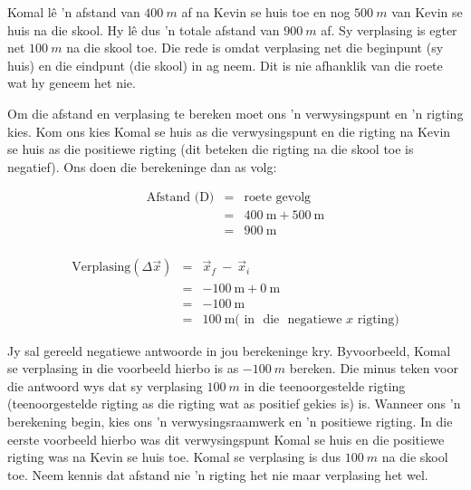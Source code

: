 Komal l\^e 'n afstand van $400~m$ af na Kevin se huis toe en nog $500~m$ van Kevin se huis na die skool. Hy l\^e dus 'n totale afstand van $900~m$ af. Sy verplasing is egter net $100~m$ na die skool toe. Die rede is omdat verplasing net die beginpunt (sy huis) en die eindpunt (die skool) in ag neem. Dit is nie afhanklik van die roete wat hy geneem het nie.

Om die afstand en verplasing te bereken moet ons 'n verwysingspunt en 'n rigting kies. Kom ons kies Komal se huis as die verwysingspunt en die rigting na Kevin se huis as die positiewe rigting (dit beteken die rigting na die skool toe is negatief). Ons doen die berekeninge dan as volg:\par 
\begin{minipage}{0.35\textwidth}
\begin{eqnarray*}
\text{Afstand (D)} &=& \text{roete gevolg}\\
&=&400\ \text{m} + 500\ \text{m}\\
&=&900\ \text{m}\\
\end{eqnarray*}
\end{minipage}
\begin{minipage}{0.65\textwidth}
\begin{eqnarray*}
\text{Verplasing} (\Delta \vec{x}) &=& \vec{x}_f~ - ~ \vec{x}_i\\
&=&-100\ \text{m} + 0\ \text{m}\\
&=&-100\ \text{m}\\
&=&100\ \text{m} \text{( in ~die~ negatiewe~} x \text{~rigting)}
\end{eqnarray*}
\end{minipage}\par


Jy sal gereeld negatiewe antwoorde in jou berekeninge kry. Byvoorbeeld, Komal se verplasing in die voorbeeld hierbo is as $-100~m$ bereken. Die minus teken voor die antwoord wys dat sy verplasing $100~m$ in die teenoorgestelde rigting (teenoorgestelde rigting as die rigting wat as positief gekies is) is. Wanneer ons 'n berekening begin, kies ons 'n verwysingsraamwerk en 'n positiewe rigting. In die eerste voorbeeld hierbo was dit verwysingspunt Komal se huis en die positiewe rigting was na Kevin se huis toe. Komal se verplasing is dus $100~m$ na die skool toe. Neem kennis dat afstand nie 'n rigting het nie maar verplasing het wel.\par


